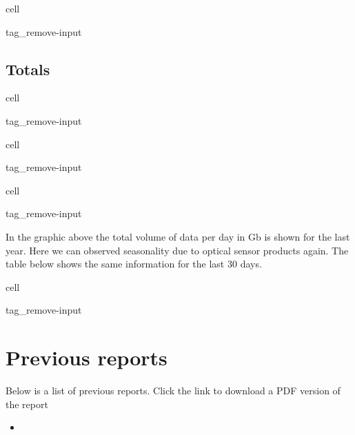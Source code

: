 \documentclass[letterpaper,10pt,english]{jupyterBook}
\begin{document}
\begin{sphinxuseclass}{cell}
\begin{sphinxuseclass}{tag_remove-input}
\end{sphinxuseclass}
\end{sphinxuseclass}

\section{Totals}
\label{\detokenize{volumes:totals}}
\begin{sphinxuseclass}{cell}
\begin{sphinxuseclass}{tag_remove-input}
\end{sphinxuseclass}
\end{sphinxuseclass}
\begin{sphinxuseclass}{cell}
\begin{sphinxuseclass}{tag_remove-input}
\end{sphinxuseclass}
\end{sphinxuseclass}
\begin{sphinxuseclass}{cell}
\begin{sphinxuseclass}{tag_remove-input}
\end{sphinxuseclass}
\end{sphinxuseclass}
\sphinxAtStartPar
In the graphic above the total volume of data per day in Gb is shown for the last year. Here we can observed seasonality due to optical sensor products again. The table below shows the same information for the last 30 days.

\begin{sphinxuseclass}{cell}
\begin{sphinxuseclass}{tag_remove-input}
\end{sphinxuseclass}
\end{sphinxuseclass}
\sphinxstepscope


\chapter{Previous reports}
\label{\detokenize{previous_reports:previous-reports}}\label{\detokenize{previous_reports::doc}}
\sphinxAtStartPar
Below is a list of previous reports. Click the link to download a PDF version of the report
\begin{itemize}
\item {} 
\sphinxAtStartPar
{}

\end{itemize}







\renewcommand{\indexname}{Index}
\printindex
\end{document}
